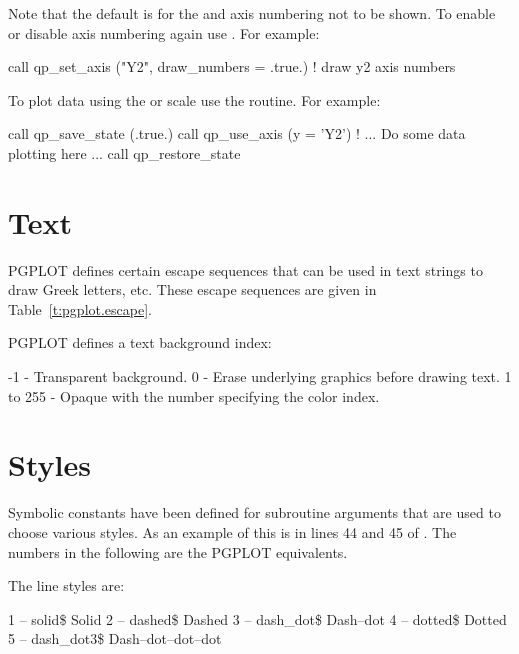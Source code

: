 Note that the default is for the  and  axis numbering
not to be shown. To enable or disable axis numbering again use
. For example:
\begin{example}
  call qp_set_axis ("Y2", draw_numbers = .true.)  ! draw y2 axis numbers
\end{example}

To plot data using the  or  scale use the
 routine. For example:
\begin{example}
  call qp_save_state (.true.)
  call qp_use_axis (y = 'Y2')
  ! ... Do some data plotting here ...
  call qp_restore_state
\end{example}

\section{Text}
\label{s:text}

PGPLOT defines certain escape sequences that can be used in text strings
to draw Greek letters, etc. These escape sequences are given in 
Table~\ref{t:pgplot.escape}.

PGPLOT defines a text background index:
\begin{example}
         -1 - Transparent background.
          0 - Erase underlying graphics before drawing text.
   1 to 255 - Opaque with the number specifying the color index.
\end{example}

\section{Styles}
\label{s:styles}

Symbolic constants have been defined for \quickplot subroutine
arguments that are used to choose various styles. As an example of
this is in lines 44 and 45 of . The
numbers in the following are the PGPLOT equivalents.

The \quickplot line styles are:
\begin{example}
    1 -- solid\$                  Solid
    2 -- dashed\$                 Dashed
    3 -- dash_dot\$               Dash--dot 
    4 -- dotted\$                 Dotted
    5 -- dash_dot3\$              Dash--dot--dot--dot        
\end{example}

